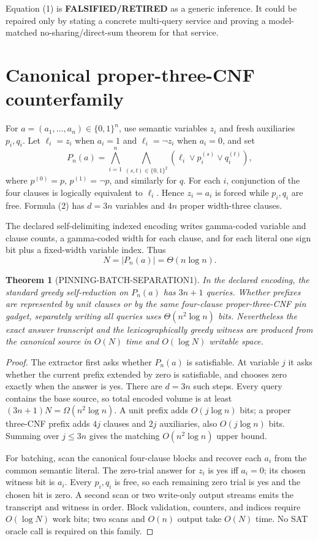\documentclass[11pt]{article}
\newtheorem{theorem}{Theorem}
\begin{document}
Equation (1) is \textbf{FALSIFIED/RETIRED} as a generic inference.  It could
be repaired only by stating a concrete multi-query service and proving a
model-matched no-sharing/direct-sum theorem for that service.

\section{Canonical proper-three-CNF counterfamily}
For $a=(a_1,\ldots,a_n)\in\{0,1\}^n$, use semantic variables $z_i$ and fresh
auxiliaries $p_i,q_i$.  Let $\ell_i=z_i$ when $a_i=1$ and
$\ell_i=\neg z_i$ when $a_i=0$, and set
\[
P_n(a)=\bigwedge_{i=1}^{n}
\bigwedge_{(s,t)\in\{0,1\}^2}
(\ell_i\vee p_i^{(s)}\vee q_i^{(t)}),
\tag{2}
\]
where $p^{(0)}=p$, $p^{(1)}=\neg p$, and similarly for $q$.
For each $i$, conjunction of the four clauses is logically equivalent to
$\ell_i$.  Hence $z_i=a_i$ is forced while $p_i,q_i$ are free.  Formula (2)
has $d=3n$ variables and $4n$ proper width-three clauses.

The declared self-delimiting indexed encoding writes gamma-coded variable and
clause counts, a gamma-coded width for each clause, and for each literal one
sign bit plus a fixed-width variable index.  Thus
\[
N=|P_n(a)|=\Theta(n\log n).
\tag{3}
\]

\begin{theorem}[PINNING-BATCH-SEPARATION1]
In the declared encoding, the standard greedy self-reduction on $P_n(a)$ has
$3n+1$ queries.  Whether prefixes are represented by unit clauses or by the
same four-clause proper-three-CNF pin gadget, separately writing all queries
uses $\Theta(n^2\log n)$ bits.  Nevertheless the exact answer transcript and
the lexicographically greedy witness are produced from the canonical source
in $O(N)$ time and $O(\log N)$ writable space.
\end{theorem}

\begin{proof}
The extractor first asks whether $P_n(a)$ is satisfiable.  At variable $j$ it
asks whether the current prefix extended by zero is satisfiable, and chooses
zero exactly when the answer is yes.  There are $d=3n$ such steps.  Every
query contains the base source, so total encoded volume is at least
$(3n+1)N=\Omega(n^2\log n)$.  A unit prefix adds $O(j\log n)$ bits; a proper
three-CNF prefix adds $4j$ clauses and $2j$ auxiliaries, also
$O(j\log n)$ bits.  Summing over $j\le3n$ gives the matching
$O(n^2\log n)$ upper bound.

For batching, scan the canonical four-clause blocks and recover each $a_i$
from the common semantic literal.  The zero-trial answer for $z_i$ is yes iff
$a_i=0$; its chosen witness bit is $a_i$.  Every $p_i,q_i$ is free, so each
remaining zero trial is yes and the chosen bit is zero.  A second scan or two
write-only output streams emits the transcript and witness in order.  Block
validation, counters, and indices require $O(\log N)$ work bits; two scans and
$O(n)$ output take $O(N)$ time.  No SAT oracle call is required on this
family.
\end{proof}
\end{document}
